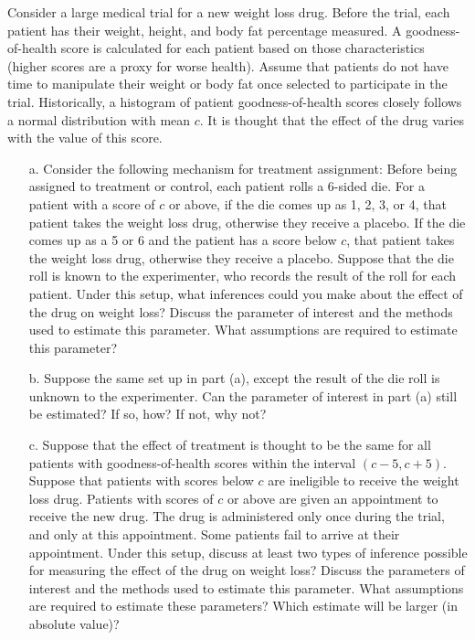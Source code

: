 \documentclass{article}
\begin{document}
\noindent Consider a large medical trial for a new weight loss
drug.  Before the trial, each patient has their weight, height, and
body fat percentage measured.  A goodness-of-health score is
calculated for each patient based on those characteristics (higher
scores are a proxy for worse health).  Assume that patients do not
have time to manipulate their weight or body fat once selected to
participate in the trial.  Historically, a histogram of patient
goodness-of-health scores closely follows a normal distribution with
mean $c$.  It is thought that the effect of the drug varies with the
value of this score.
      \begin{itemize}
        \item[a.]  Consider the following mechanism for treatment assignment:
          Before being assigned to treatment or control, each patient rolls a 6-sided die.
          For a patient with a score of $c$ or above, if the die comes up as
          1, 2, 3, or 4, 
          that patient takes the weight loss drug, otherwise they
          receive a placebo.  If the die comes up as a 5 or 6 and the
          patient has a score below $c$, that patient takes the weight
          loss drug, otherwise they receive a placebo.  Suppose that
          the die roll is known to the experimenter, who records the
          result of the roll for each patient.  Under this setup, what
          inferences could you make about the effect of the drug on
          weight loss?  Discuss the parameter of interest and the
          methods used to estimate this parameter.  What assumptions
          are required to estimate this parameter?
        \item[b.]
          Suppose the same set up in part (a), except the result of the die roll is unknown to the
          experimenter.  
          Can the parameter of interest in part (a) still be estimated?
          If so, how?  If not, why not?
        \item[c.]
          Suppose that the effect of treatment is thought to be the same
          for all patients with goodness-of-health scores within the interval
          $(c-5,c+5)$.
          Suppose that patients with scores below $c$ 
          are ineligible to receive the weight loss drug.
          Patients with scores of $c$ or above are given an appointment to receive 
          the new drug.
          The drug is administered only once during the trial, and only at this appointment.
          Some patients fail to arrive at their appointment.
          Under this setup,
          discuss at least two types of inference 
          possible for measuring the effect of the drug on weight loss? 
          Discuss the parameters of interest and the methods used to estimate this parameter.
          What assumptions are required to estimate these parameters?
          Which estimate will be larger (in absolute value)?          
      \end{itemize}
\end{document}
